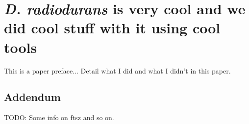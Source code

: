 \chapter[\textit{D. radiodurans}: short title]{\textit{D. radiodurans} is very cool and we did cool stuff with it using cool tools}\label{drad}

\localtableofcontents

This is a paper preface... Detail what I did and what I didn't in this paper.


% 

\section{Addendum}

TODO: Some info on ftsz and so on.
